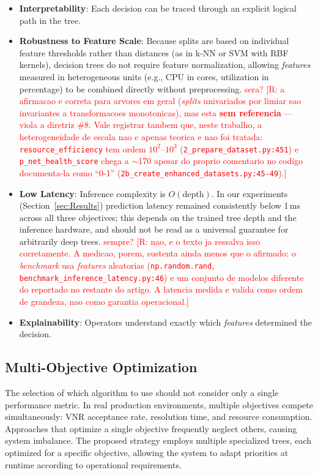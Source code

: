 \documentclass[runningheads]{llncs}
\begin{document}
\begin{itemize}
    \item \textbf{Interpretability}: Each decision can be traced through an explicit logical path in the tree.
    \item \textbf{Robustness to Feature Scale}: Because splits are based on individual feature thresholds rather than distances (as in k-NN or SVM with RBF kernels), decision trees do not require feature normalization, allowing \textit{features} measured in heterogeneous units (e.g., CPU in cores, utilization in percentage) to be combined directly without preprocessing. \textcolor{red}{sera?} \textcolor{red}{[R: a afirmacao e correta para arvores em geral (\emph{splits} univariados por limiar sao invariantes a transformacoes monotonicas), mas esta \textbf{sem referencia} --- viola a diretriz \#8. Vale registrar tambem que, neste trabalho, a heterogeneidade de escala nao e apenas teorica e nao foi tratada: \texttt{resource\_efficiency} tem ordem $10^2$--$10^3$ (\texttt{2\_prepare\_dataset.py:451}) e \texttt{p\_net\_health\_score} chega a $\sim$170 apesar do proprio comentario no codigo documenta-la como ``0-1'' (\texttt{2b\_create\_enhanced\_datasets.py:45-49}).]}
    \item \textbf{Low Latency}: Inference complexity is $O(\text{depth})$. In our experiments (Section~\ref{sec:Results}) prediction latency remained consistently below 1\,ms across all three objectives; this depends on the trained tree depth and the inference hardware, and should not be read as a universal guarantee for arbitrarily deep trees. \textcolor{red}{sempre?} \textcolor{red}{[R: nao, e o texto ja ressalva isso corretamente. A medicao, porem, sustenta ainda menos que o afirmado: o \emph{benchmark} usa \emph{features} aleatorias (\texttt{np.random.rand}, \texttt{benchmark\_inference\_latency.py:46}) e um conjunto de modelos diferente do reportado no restante do artigo. A latencia medida e valida como ordem de grandeza, nao como garantia operacional.]}
    \item \textbf{Explainability}: Operators understand exactly which \textit{features} determined the decision.
\end{itemize}


\subsection{Multi-Objective Optimization}
\label{subsec:multiobj}

The selection of which algorithm to use should not consider only a single performance metric. In real production environments, multiple objectives compete simultaneously: VNR acceptance rate, resolution time, and resource consumption. Approaches that optimize a single objective frequently neglect others, causing system imbalance. The proposed strategy employs multiple specialized trees, each optimized for a specific objective, allowing the system to adapt priorities at runtime according to operational requirements.
\end{document}
